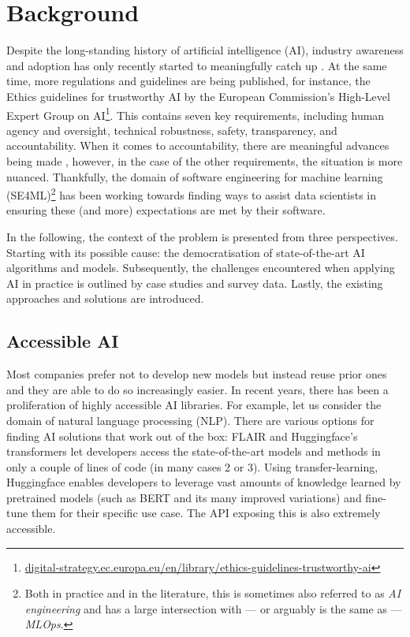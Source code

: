 \chapter{Background} \label{chapter:background}

Despite the long-standing history of artificial intelligence (AI), industry awareness and adoption has only recently started to meaningfully catch up \cite{wirtz2019artificial}. At the same time, more regulations and guidelines are being published, for instance, the Ethics guidelines for trustworthy AI by the European Commission's High-Level Expert Group on AI\footnote{\href{https://digital-strategy.ec.europa.eu/en/library/ethics-guidelines-trustworthy-ai}{digital-strategy.ec.europa.eu/en/library/ethics-guidelines-trustworthy-ai}}. This contains seven key requirements, including human agency and oversight, technical robustness, safety, transparency, and accountability. When it comes to accountability, there are meaningful advances being made \cite{raji2020closing}, however, in the case of the other requirements, the situation is more nuanced. Thankfully, the domain of software engineering for machine learning (SE4ML)\footnote{Both in practice and in the literature, this is sometimes also referred to as \textit{AI engineering} and has a large intersection with --- or arguably is the same as --- \textit{MLOps}.} has been working towards finding ways to assist data scientists in ensuring these (and more) expectations are met by their software.

In the following, the context of the problem is presented from three perspectives. Starting with its possible cause: the democratisation of state-of-the-art AI algorithms and models. Subsequently, the challenges encountered when applying AI in practice is outlined by case studies and survey data. Lastly, the existing approaches and solutions are introduced.

\section{Accessible AI} \label{section:accessible-ai}

Most companies prefer not to develop new models but instead reuse prior ones \cite{bosch2021engineering} and they are able to do so increasingly easier. In recent years, there has been a proliferation of highly accessible AI libraries. For example, let us consider the domain of natural language processing (NLP). There are various options for finding AI solutions that work out of the box: FLAIR \cite{akbik2019flair} and Huggingface's transformers \cite{wolf2019huggingface} let developers access the state-of-the-art models and methods in only a couple of lines of code (in many cases 2 or 3). Using transfer-learning, Huggingface enables developers to leverage vast amounts of knowledge learned by pretrained models (such as BERT \cite{devlin2018bert} and its many improved variations) and fine-tune them for their specific use case. The API exposing this is also extremely accessible.

